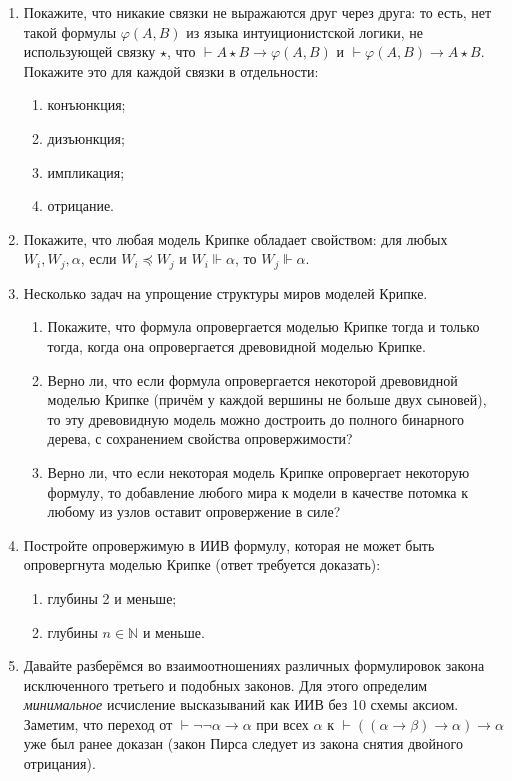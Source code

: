 \documentclass[10pt,a4paper,oneside]{article}
\begin{document}
\begin{enumerate}
\item Покажите, что никакие связки не выражаются друг через друга: то есть, нет такой формулы $\varphi(A,B)$ из языка 
интуиционистской логики, не использующей связку $\star$, что $\vdash A \star B \rightarrow \varphi(A,B)$ и $\vdash\varphi(A,B) \rightarrow A \star B$.
Покажите это для каждой связки в отдельности:
\begin{enumerate}
\item конъюнкция;
\item дизъюнкция;
\item импликация;
\item отрицание.
\end{enumerate}

\item Покажите, что любая модель Крипке обладает свойством: для любых $W_i, W_j, \alpha$, 
если $W_i \preceq W_j$ и $W_i \Vdash \alpha$, то $W_j \Vdash \alpha$.

\item Несколько задач на упрощение структуры миров моделей Крипке.
\begin{enumerate}
\item Покажите, что формула опровергается моделью Крипке тогда и только тогда, когда она
опровергается древовидной моделью Крипке.

\item Верно ли, что если формула опровергается некоторой древовидной моделью Крипке (причём
у каждой вершины не больше двух сыновей), то эту 
древовидную модель можно достроить до полного бинарного дерева, с сохранением свойства опровержимости?

\item Верно ли, что если некоторая модель Крипке опровергает некоторую формулу,
то добавление любого мира к модели в качестве потомка к любому из узлов оставит опровержение в силе?
\end{enumerate}

\item Постройте опровержимую в ИИВ формулу, которая не может быть опровергнута моделью Крипке (ответ требуется доказать):
\begin{enumerate}
\item глубины 2 и меньше;
\item глубины $n \in \mathbb{N}$ и меньше.
\end{enumerate}

\item Давайте разберёмся во взаимоотношениях различных формулировок закона исключенного третьего и подобных
законов. Для этого определим \emph{минимальное} исчисление высказываний как ИИВ без 10 схемы аксиом.
Заметим, что переход от $\vdash\neg\neg\alpha\rightarrow\alpha$ при всех $\alpha$ к
$\vdash((\alpha\rightarrow\beta)\rightarrow\alpha)\rightarrow\alpha$ уже был ранее доказан 
(закон Пирса следует из закона снятия двойного отрицания).


\end{enumerate}
\end{document}
